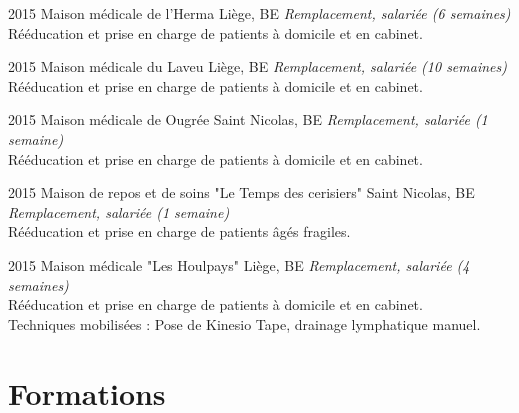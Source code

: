 \documentclass[]{cv-lea}
\begin{document}
\begin{entrylist}
\entry
{2015}
{Maison médicale de l'Herma}
{Liège, BE}
{\emph{Remplacement, salariée (6 semaines)}\\
Rééducation et prise en charge de patients à domicile et en cabinet.
}
\end{entrylist}
\begin{entrylist}
\entry
{2015}
{Maison médicale du Laveu}
{Liège, BE}
{\emph{Remplacement, salariée (10 semaines)}\\
Rééducation et prise en charge de patients à domicile et en cabinet.
}
\end{entrylist}
\begin{entrylist}
\entry
{2015}
{Maison médicale de Ougrée}
{Saint Nicolas, BE}
{\emph{Remplacement, salariée (1 semaine)}\\
Rééducation et prise en charge de patients à domicile et en cabinet.
}
\end{entrylist}
\begin{entrylist}
\entry
{2015}
{Maison de repos et de soins "Le Temps des cerisiers"}
{Saint Nicolas, BE}
{\emph{Remplacement, salariée (1 semaine)}\\
Rééducation et prise en charge de patients âgés fragiles.
}
\end{entrylist}
\begin{entrylist}
\entry
{2015}
{Maison médicale "Les Houlpays"}
{Liège, BE}
{\emph{Remplacement, salariée (4 semaines)}\\
Rééducation et prise en charge de patients à domicile et en cabinet.\\
Techniques mobilisées : Pose de Kinesio Tape, drainage lymphatique manuel.
}
\end{entrylist}

\section{Formations}
\end{document}
